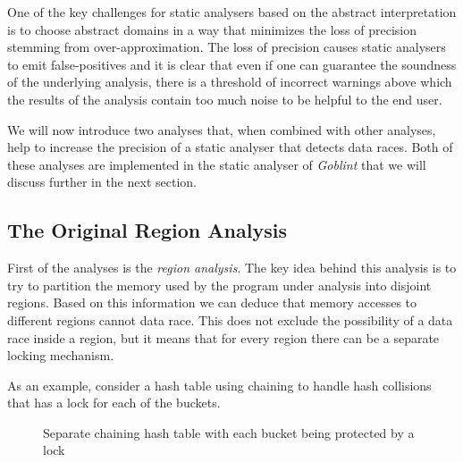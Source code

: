 \documentclass[..thesis.tex]{subfiles}
\begin{document}
One of the key challenges for static analysers based on the abstract interpretation is to choose abstract domains in a way that minimizes the loss
of precision stemming from over-approximation.
The loss of precision causes static analysers to emit false-positives and it is clear
that even if one can guarantee the soundness of the underlying analysis, there is a threshold of incorrect warnings above which the results of the analysis contain too much noise to be helpful to the end user.

We will now introduce two analyses that, when combined with other analyses, help to increase the precision of a static analyser that detects data races.
Both of these analyses are implemented in the static analyser of \textit{Goblint} that we will discuss further in the next section.


\subsection{The Original Region Analysis}

First of the analyses is the \textit{region analysis}. The key idea behind this analysis is to try to partition the memory used by the program under analysis into disjoint regions. Based on this information we can deduce that memory accesses to different regions cannot data race.
This does not exclude the possibility of a data race inside a region, but it means that for every region there can be a separate locking mechanism.

As an example, consider a hash table using chaining to handle hash collisions that has a lock for each of the buckets.


\begin{figure}[H]
  \centering
  \caption{Separate chaining hash table with each bucket being protected by a lock} 
\end{figure}
\end{document}
